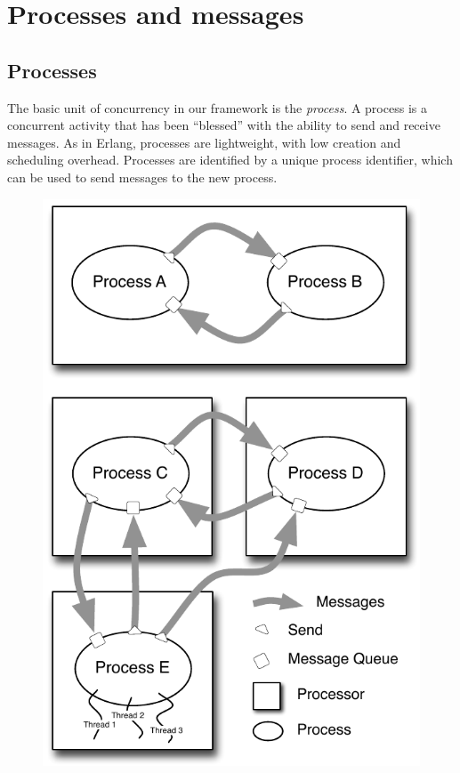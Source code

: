 \documentclass[preprint]{sigplanconf}
\begin{document}
\section{Processes and messages}
\subsection{Processes}
\label{Processes}
The basic unit of concurrency in our framework is the {\em process}. A process is a concurrent activity that has been ``blessed'' with the ability to send and receive messages. As in Erlang, processes are lightweight, with low creation and scheduling overhead.  Processes are identified by a unique process identifier, which can be used to send messages to the new process.

\begin{figure}[!b]
\centerline {
\includegraphics[width=\columnwidth]{threadsAndProcesses}
}
\end{figure}
\end{document}

